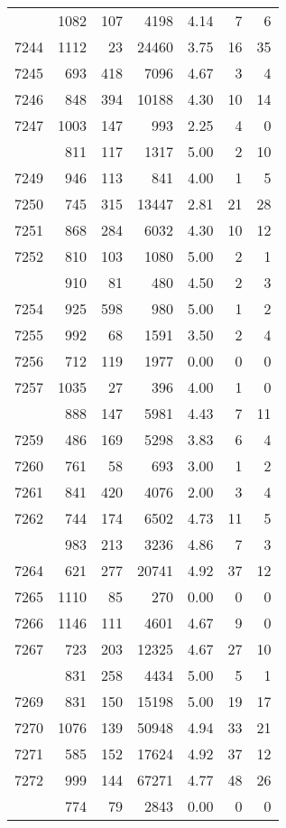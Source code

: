 \documentclass[
]{article}
\begin{document}
\begin{table}
\begin{tabular}[t]{lrrrrrr}
\addlinespace
7243 & 1082 & 107 & 4198 & 4.14 & 7 & 6\\
7244 & 1112 & 23 & 24460 & 3.75 & 16 & 35\\
7245 & 693 & 418 & 7096 & 4.67 & 3 & 4\\
7246 & 848 & 394 & 10188 & 4.30 & 10 & 14\\
7247 & 1003 & 147 & 993 & 2.25 & 4 & 0\\
\addlinespace
7248 & 811 & 117 & 1317 & 5.00 & 2 & 10\\
7249 & 946 & 113 & 841 & 4.00 & 1 & 5\\
7250 & 745 & 315 & 13447 & 2.81 & 21 & 28\\
7251 & 868 & 284 & 6032 & 4.30 & 10 & 12\\
7252 & 810 & 103 & 1080 & 5.00 & 2 & 1\\
\addlinespace
7253 & 910 & 81 & 480 & 4.50 & 2 & 3\\
7254 & 925 & 598 & 980 & 5.00 & 1 & 2\\
7255 & 992 & 68 & 1591 & 3.50 & 2 & 4\\
7256 & 712 & 119 & 1977 & 0.00 & 0 & 0\\
7257 & 1035 & 27 & 396 & 4.00 & 1 & 0\\
\addlinespace
7258 & 888 & 147 & 5981 & 4.43 & 7 & 11\\
7259 & 486 & 169 & 5298 & 3.83 & 6 & 4\\
7260 & 761 & 58 & 693 & 3.00 & 1 & 2\\
7261 & 841 & 420 & 4076 & 2.00 & 3 & 4\\
7262 & 744 & 174 & 6502 & 4.73 & 11 & 5\\
\addlinespace
7263 & 983 & 213 & 3236 & 4.86 & 7 & 3\\
7264 & 621 & 277 & 20741 & 4.92 & 37 & 12\\
7265 & 1110 & 85 & 270 & 0.00 & 0 & 0\\
7266 & 1146 & 111 & 4601 & 4.67 & 9 & 0\\
7267 & 723 & 203 & 12325 & 4.67 & 27 & 10\\
\addlinespace
7268 & 831 & 258 & 4434 & 5.00 & 5 & 1\\
7269 & 831 & 150 & 15198 & 5.00 & 19 & 17\\
7270 & 1076 & 139 & 50948 & 4.94 & 33 & 21\\
7271 & 585 & 152 & 17624 & 4.92 & 37 & 12\\
7272 & 999 & 144 & 67271 & 4.77 & 48 & 26\\
\addlinespace
7273 & 774 & 79 & 2843 & 0.00 & 0 & 0\\

\end{tabular}
\end{table}
\end{document}
